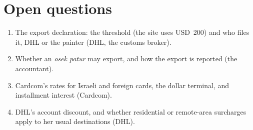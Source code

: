 \documentclass[11pt,a4paper]{article}
\begin{document}
\section{Open questions}
\begin{enumerate}
  \item The export declaration: the threshold (the site uses USD~200) and who files it, DHL or
    the painter (DHL, the customs broker).
  \item Whether an \emph{osek patur} may export, and how the export is reported (the accountant).
  \item Cardcom's rates for Israeli and foreign cards, the dollar terminal, and installment
    interest (Cardcom).
  \item DHL's account discount, and whether residential or remote-area surcharges apply to her
    usual destinations (DHL).
\end{enumerate}
\end{document}
